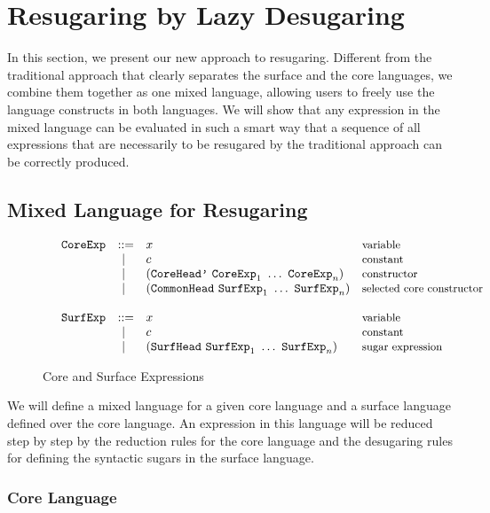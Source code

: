 
\section{Resugaring by Lazy Desugaring}
\label{sec3}

In this section, we present our new approach to resugaring. Different from the traditional approach that clearly separates the surface and the core languages, we combine them together as one mixed language, allowing users to freely use the language constructs in both languages. We will show that any expression in the mixed language can be evaluated in such a smart way that a sequence of all expressions that are necessarily to be resugared by the traditional approach can be correctly produced.

\subsection{Mixed Language for Resugaring}

\begin{figure}[thb]
	\[
	\begin{array}{lllll}
	 &\mbox{\tt CoreExp} &::=& x  & \mbox{{\small variable}}\\
	       &&~|~& c  & \mbox{{\small constant}}\\
				 &&~|~& (\mbox{\tt CoreHead'}~\mbox{\tt CoreExp}_1~\ldots~\mbox{\tt CoreExp}_n) & \mbox{{\small constructor}}\\
				 &&~|~& (\mbox{\tt CommonHead}~\mbox{\tt SurfExp}_1~\ldots~\mbox{\tt SurfExp}_n) & \mbox{{\small selected core constructor}}\\
	\\
	 &\mbox{\tt SurfExp} &::=& x  & \mbox{{\small variable}}\\
	       &&~|~& c  & \mbox{{\small constant}}\\
				 &&~|~& (\mbox{\tt SurfHead}~\mbox{\tt SurfExp}_1~\ldots~\mbox{\tt SurfExp}_n) & \mbox{{\small sugar expression}}
	\end{array}
	\]
	\caption{Core and Surface Expressions}
	\label{fig:expression}
\end{figure}

We will define a mixed language for a given core language and a surface language defined over the core language. An expression in this language will be reduced step by step by the reduction rules for the core language and the desugaring rules for defining the syntactic sugars in the surface language.

\subsubsection{Core Language}

